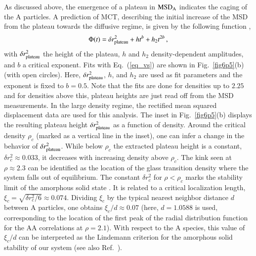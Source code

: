 As discussed above, the emergence of a plateau in ${\rm MSD}_{\rm A}$ indicates the caging of the A particles. A prediction of MCT, describing the initial increase of the MSD from the plateau towards the diffusive regime, is given by the following function \cite{goetze2009},
%
\begin{equation}
\Phi(t) =  \delta r^2_{\rm plateau} + h t^b + h_2 t^{2b} \, ,
\label{eq_vs}
\end{equation}
%
with $\delta r^2_{\rm plateau}$ the height of the plateau, $h$ and $h_2$ density-dependent amplitudes, and $b$ a critical exponent. Fits with Eq.~(\ref{eq_vs}) are shown in Fig.~\ref{fig6p5}(b) (with open circles). Here, $\delta r^2_{\rm plateau}$, $h$, and $h_2$ are used as fit parameters and the exponent is fixed to $b=0.5$. Note that the fits are done for densities up to $2.25$ and for densities above this, plateau heights are just read off from the MSD measurements. In the large density regime, the rectified mean squared displacement data are used for this analysis. The inset in Fig.~\ref{fig6p5}(b) displays the resulting plateau height $\delta r^2_{\rm plateau}$ as a function of density. Around the critical density $\rho_c$ (marked as a vertical line in the inset), one can infer a change in the behavior of $\delta r^2_{\rm plateau}$. While below $\rho_c$ the extracted plateau height is a constant, $\delta r^2_c \approx 0.033$, it decreases with increasing density above $\rho_c$. The kink seen at $\rho\approx 2.3$ can be identified as the location of the glass transition density where the system falls out of equilibrium. The constant $\delta r^2_c$ for $\rho < \rho_c$ marks the stability limit of the amorphous solid state \cite{goetze2009, fuchs1998, lamp2022}. It is related to a critical localization length, $\xi_c = \sqrt{\delta r^2_c /6} \approx 0.074$. Dividing $\xi_c$ by the typical nearest neighbor distance $d$ between A particles, one obtains $\xi_c/d \approx 0.07$ (here, $d=1.0588$ is used, corresponding to the location of the first peak of the radial distribution function for the AA correlations at $\rho=2.1$). With respect to the A species, this value of $\xi_c/d$ can be interpreted as the Lindemann criterion for the amorphous solid stability of our system (see also Ref.~\cite{lamp2022}).

